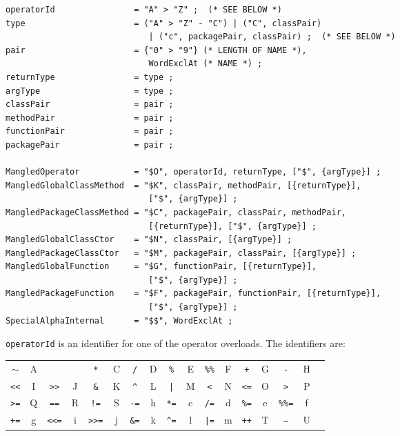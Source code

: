 \documentclass{article}
\begin{document}
\begin{verbatim}
operatorId                = "A" > "Z" ;  (* SEE BELOW *)
type                      = ("A" > "Z" - "C") | ("C", classPair)
                             | ("c", packagePair, classPair) ;  (* SEE BELOW *)
pair                      = {"0" > "9"} (* LENGTH OF NAME *),
                             WordExclAt (* NAME *) ;
returnType                = type ;
argType                   = type ;
classPair                 = pair ;
methodPair                = pair ;
functionPair              = pair ;
packagePair               = pair ;

MangledOperator           = "$O", operatorId, returnType, ["$", {argType}] ;
MangledGlobalClassMethod  = "$K", classPair, methodPair, [{returnType}],
                             ["$", {argType}] ;
MangledPackageClassMethod = "$C", packagePair, classPair, methodPair,
                             [{returnType}], ["$", {argType}] ;
MangledGlobalClassCtor    = "$N", classPair, [{argType}] ;
MangledPackageClassCtor   = "$M", packagePair, classPair, [{argType}] ;
MangledGlobalFunction     = "$G", functionPair, [{returnType}],
                             ["$", {argType}] ;
MangledPackageFunction    = "$F", packagePair, functionPair, [{returnType}],
                             ["$", {argType}] ;
SpecialAlphaInternal      = "$$", WordExclAt ;
\end{verbatim}

\texttt{operatorId} is an identifier for one of the operator overloads. The
identifiers are:
\newcommand{\QQ}[2]{\texttt{#1} & #2 &}
\begin{center}
\begin{tabular}{|cc|cc|cc|cc|cc|cc|cc|cc|l}
\cline{1-16}
\QQ{$\sim$}{A}  && \QQ{*}{C}   \QQ{/}{D}   \QQ{\%}{E}  \QQ{\%\%}{F}  \QQ{+}{G}   \QQ{-}{H} \\
\QQ{<<}{I}      \QQ{>>}{J}  \QQ{\&}{K}  \QQ{\^}{L}  \QQ{|}{M}   \QQ{<}{N}     \QQ{<=}{O}  \QQ{>}{P} \\
\QQ{>=}{Q}      \QQ{==}{R}  \QQ{!=}{S}  \QQ{-=}{h}  \QQ{*=}{c}  \QQ{/=}{d}    \QQ{\%=}{e} \QQ{\%\%=}{f} \\
\QQ{+=}{g}      \QQ{<<=}{i} \QQ{>>=}{j} \QQ{\&=}{k} \QQ{\^{}=}{l} \QQ{|=}{m}  \QQ{++}{T}  \QQ{--}{U} \\
\cline{1-16}
\end{tabular}
\end{center}
\end{document}
